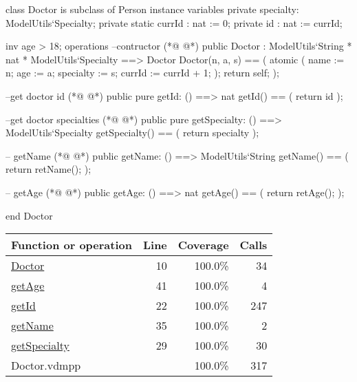 \begin{vdmpp}[breaklines=true]
class Doctor is subclass of Person
instance variables
 private specialty: ModelUtils`Specialty;
 private static currId : nat := 0;
 private id : nat := currId;
 
 inv age > 18;
operations
 --contructor
(*@
\label{Doctor:10}
@*)
  public Doctor : ModelUtils`String * nat * ModelUtils`Specialty ==> Doctor
  Doctor(n, a, s) == (
   atomic (
    name := n;
    age := a;
    specialty := s;
    currId := currId + 1;
   );
   return self;
  );
  
  --get doctor id
(*@
\label{getId:22}
@*)
  public pure getId: () ==> nat
  getId() == (
   return id
  );
  
  
  --get doctor specialties
(*@
\label{getSpecialty:29}
@*)
  public pure getSpecialty: () ==> ModelUtils`Specialty
  getSpecialty() == (
   return specialty
  );
  
  -- getName
(*@
\label{getName:35}
@*)
  public getName: () ==> ModelUtils`String
  getName() == (
    return retName();  
  );

  -- getAge 
(*@
\label{getAge:41}
@*)
  public getAge: () ==> nat
  getAge() == (
    return retAge();  
  );

end Doctor
\end{vdmpp}
\bigskip
\begin{longtable}{|l|r|r|r|}
\hline
Function or operation & Line & Coverage & Calls \\
\hline
\hline
\hyperref[Doctor:10]{Doctor} & 10&100.0\% & 34 \\
\hline
\hyperref[getAge:41]{getAge} & 41&100.0\% & 4 \\
\hline
\hyperref[getId:22]{getId} & 22&100.0\% & 247 \\
\hline
\hyperref[getName:35]{getName} & 35&100.0\% & 2 \\
\hline
\hyperref[getSpecialty:29]{getSpecialty} & 29&100.0\% & 30 \\
\hline
\hline
Doctor.vdmpp & & 100.0\% & 317 \\
\hline
\end{longtable}

